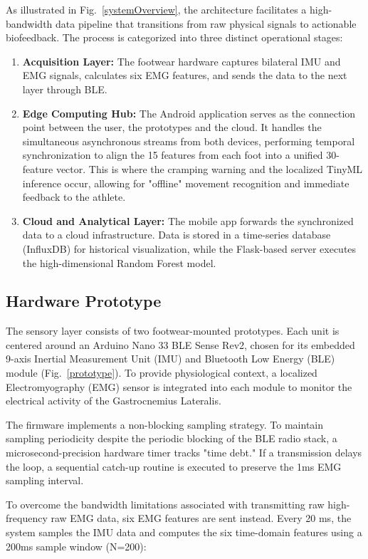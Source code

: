 \documentclass[conference]{IEEEtran}
\begin{document}
As illustrated in Fig.~\ref{systemOverview}, the architecture facilitates a high-bandwidth data pipeline that transitions from raw physical signals to actionable biofeedback. The process is categorized into three 
distinct operational stages:

\begin{enumerate}
\item \textbf{Acquisition Layer:} The footwear hardware captures bilateral IMU and EMG signals, calculates six EMG features, and sends the data to the next layer through BLE.
\item \textbf{Edge Computing Hub:} The Android application serves as the connection point between the user, the prototypes and the cloud. It handles the simultaneous asynchronous streams from both devices, performing temporal synchronization to align the 15 features from each foot into a unified 30-feature vector. This is where the cramping warning and the localized TinyML inference occur, allowing for "offline" movement recognition and immediate feedback to the athlete.
\item \textbf{Cloud and Analytical Layer:} The mobile app forwards the synchronized data to a cloud infrastructure. Data is stored in a time-series database (InfluxDB) for historical visualization, while the Flask-based server executes the high-dimensional Random Forest model. 
\end{enumerate}


\subsection{Hardware Prototype}

The sensory layer consists of two footwear-mounted prototypes. Each unit is centered around an Arduino Nano 33 BLE Sense Rev2, chosen for its embedded 9-axis Inertial 
Measurement Unit (IMU) and Bluetooth Low Energy (BLE) module (Fig.~\ref{prototype}). To provide physiological context, a localized Electromyography (EMG) sensor is integrated into each module to monitor 
the electrical activity of the Gastrocnemius Lateralis.


The firmware implements a non-blocking sampling strategy. To maintain sampling periodicity despite the periodic blocking of the BLE radio stack, a microsecond-precision hardware timer tracks "time debt." If a 
transmission delays the loop, a sequential catch-up routine is executed to preserve the 1ms EMG sampling interval.

To overcome the bandwidth limitations associated with transmitting raw high-frequency raw EMG data, six EMG features are sent instead. Every 20 ms, the system samples the IMU data and computes the six
time-domain features using a 200ms sample window (N=200):
\end{document}
